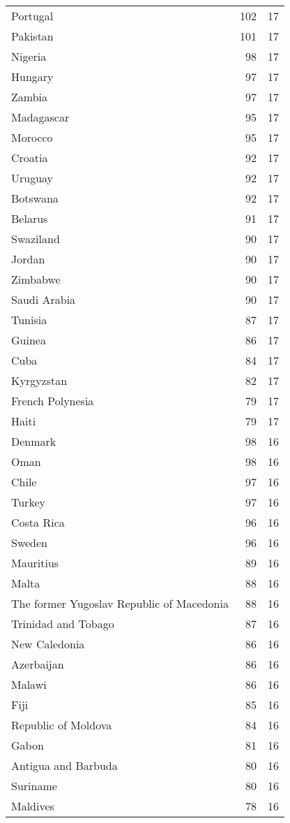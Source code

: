 \documentclass[]{article}
\begin{document}
\begin{longtable}[t]{lrr}
Portugal & 102 & 17\\
\addlinespace
Pakistan & 101 & 17\\
Nigeria & 98 & 17\\
Hungary & 97 & 17\\
Zambia & 97 & 17\\
Madagascar & 95 & 17\\
\addlinespace
Morocco & 95 & 17\\
Croatia & 92 & 17\\
Uruguay & 92 & 17\\
Botswana & 92 & 17\\
Belarus & 91 & 17\\
\addlinespace
Swaziland & 90 & 17\\
Jordan & 90 & 17\\
Zimbabwe & 90 & 17\\
Saudi Arabia & 90 & 17\\
Tunisia & 87 & 17\\
\addlinespace
Guinea & 86 & 17\\
Cuba & 84 & 17\\
Kyrgyzstan & 82 & 17\\
French Polynesia & 79 & 17\\
Haiti & 79 & 17\\
\addlinespace
Denmark & 98 & 16\\
Oman & 98 & 16\\
Chile & 97 & 16\\
Turkey & 97 & 16\\
Costa Rica & 96 & 16\\
\addlinespace
Sweden & 96 & 16\\
Mauritius & 89 & 16\\
Malta & 88 & 16\\
The former Yugoslav Republic of Macedonia & 88 & 16\\
Trinidad and Tobago & 87 & 16\\
\addlinespace
New Caledonia & 86 & 16\\
Azerbaijan & 86 & 16\\
Malawi & 86 & 16\\
Fiji & 85 & 16\\
Republic of Moldova & 84 & 16\\
\addlinespace
Gabon & 81 & 16\\
Antigua and Barbuda & 80 & 16\\
Suriname & 80 & 16\\
Maldives & 78 & 16\\

\end{longtable}
\end{document}
